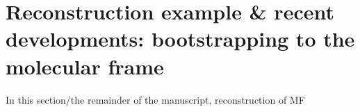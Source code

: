 \section{Reconstruction example & recent developments: bootstrapping to the molecular frame}

In this section/the remainder of the manuscript, reconstruction of MF